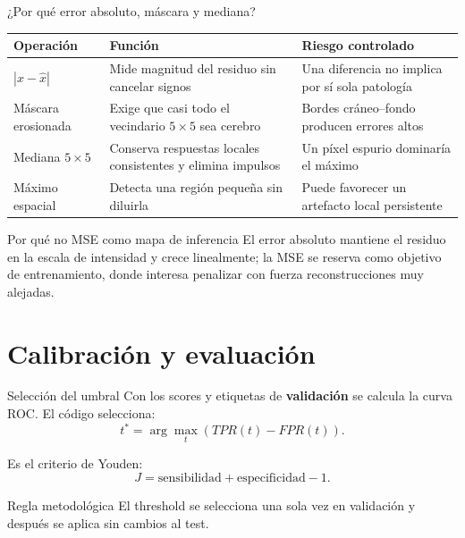 \documentclass[10pt,aspectratio=169]{beamer}
\begin{document}
\begin{frame}{¿Por qué error absoluto, máscara y mediana?}
  \small
  \begin{tabular}{p{3.1cm}p{5.6cm}p{3.1cm}}
    \toprule
    Operación & Función & Riesgo controlado \\
    \midrule
    $|x-\hat{x}|$ & Mide magnitud del residuo sin cancelar signos & Una diferencia no implica por sí sola patología \\
    Máscara erosionada & Exige que casi todo el vecindario $5\times5$ sea cerebro & Bordes cráneo--fondo producen errores altos \\
    Mediana $5\times5$ & Conserva respuestas locales consistentes y elimina impulsos & Un píxel espurio dominaría el máximo \\
    Máximo espacial & Detecta una región pequeña sin diluirla & Puede favorecer un artefacto local persistente \\
    \bottomrule
  \end{tabular}

  \vspace{0.25cm}
  \begin{block}{Por qué no MSE como mapa de inferencia}
    El error absoluto mantiene el residuo en la escala de intensidad y crece
    linealmente; la MSE se reserva como objetivo de entrenamiento, donde interesa
    penalizar con fuerza reconstrucciones muy alejadas.
  \end{block}
\end{frame}

\section{Calibración y evaluación}

\begin{frame}{Selección del umbral}
  Con los scores y etiquetas de \textbf{validación} se calcula la curva ROC.
  El código selecciona:
  \[
    t^*=\arg\max_t\left(TPR(t)-FPR(t)\right).
  \]

  Es el criterio de Youden:
  \[
    J=\mathrm{sensibilidad}+\mathrm{especificidad}-1.
  \]

  \begin{block}{Regla metodológica}
    El threshold se selecciona una sola vez en validación y después se aplica
    sin cambios al test.
  \end{block}
\end{frame}
\end{document}
